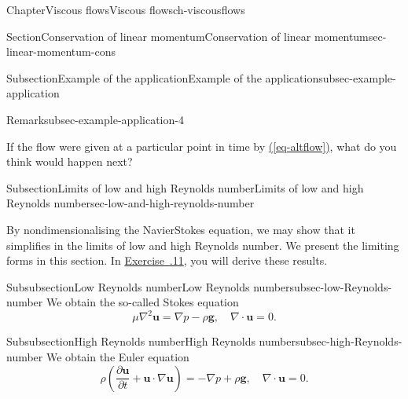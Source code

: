 \documentclass[oneside,10pt,]{book}
\newcommand{\xreffont}{\relax}
\numberwithin{equation}{section}
\newcommand{\pd}[2]{\frac{\partial#1}{\partial#2}}
\newcommand{\bu}{\boldsymbol{u}}
\newcommand{\bg}{\boldsymbol{g}}
\begin{document}
\begin{chapterptx}{Chapter}{Viscous flows}{}{Viscous flows}{}{}{ch-viscousflows}
\begin{sectionptx}{Section}{Conservation of linear momentum}{}{Conservation of linear momentum}{}{}{sec-linear-momentum-cons}
\begin{subsectionptx}{Subsection}{Example of the application}{}{Example of the application}{}{}{subsec-example-application}
\begin{remark}{Remark}{}{subsec-example-application-4}
\par
If the flow were given at a particular point in time by \hyperref[eq-altflow]{({\xreffont\ref{eq-altflow}})}, what do you think would happen next?%
\end{remark}
\end{subsectionptx}
%
%
\typeout{************************************************}
\typeout{************************************************}
%
\begin{subsectionptx}{Subsection}{Limits of low and high Reynolds number}{}{Limits of low and high Reynolds number}{}{}{sec-low-and-high-reynolds-number}
\begin{introduction}{}%
By nondimensionalising the Navier\textendash{}Stokes equation, we may show that it simplifies in the limits of low and high Reynolds number. We present the limiting forms in this section. In \hyperlink{ex-limits-low-high-Reynolds}{Exercise~{\xreffont 6.9.11}}, you will derive these results.%
\end{introduction}%
%
%
\typeout{************************************************}
\typeout{************************************************}
%
\begin{subsubsectionptx}{Subsubsection}{Low Reynolds number}{}{Low Reynolds number}{}{}{subsec-low-Reynolds-number}
We obtain the so-called Stokes equation%
\begin{equation}
\mu\nabla^2\bu=\nabla p-\rho\bg,\quad \nabla\cdot\bu=0.\label{low-reynolds-number}
\end{equation}
%
\end{subsubsectionptx}
%
%
\typeout{************************************************}
\typeout{************************************************}
%
\begin{subsubsectionptx}{Subsubsection}{High Reynolds number}{}{High Reynolds number}{}{}{subsec-high-Reynolds-number}
We obtain the Euler equation%
\begin{equation}
\rho\left(\pd{\bu}{t}+\bu\cdot\nabla\bu\right)=-\nabla p+\rho\bg,\quad \nabla\cdot\bu=0.\label{high-reynolds-number}
\end{equation}
%
\end{subsubsectionptx}
\end{subsectionptx}
\end{sectionptx}
%
%
\typeout{************************************************}

\end{chapterptx}
\end{document}
